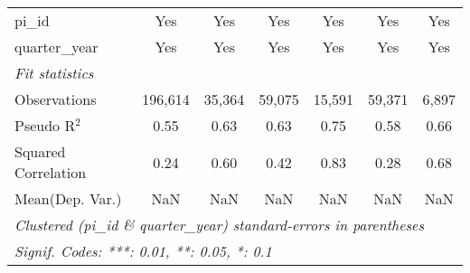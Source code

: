 \begin{tabular}{lcccccc}
   pi\_id                                                     & Yes           & Yes           & Yes           & Yes           & Yes           & Yes\\  
   quarter\_year                                              & Yes           & Yes           & Yes           & Yes           & Yes           & Yes\\  
   \midrule
   \emph{Fit statistics}\\
   Observations                                               & 196,614       & 35,364        & 59,075        & 15,591        & 59,371        & 6,897\\  
   Pseudo R$^2$                                               & 0.55          & 0.63          & 0.63          & 0.75          & 0.58          & 0.66\\  
   Squared Correlation                                        & 0.24          & 0.60          & 0.42          & 0.83          & 0.28          & 0.68\\  
Mean(Dep. Var.) & NaN & NaN & NaN & NaN & NaN & NaN \\
   \midrule \midrule
   \multicolumn{7}{l}{\emph{Clustered (pi\_id \& quarter\_year) standard-errors in parentheses}}\\
   \multicolumn{7}{l}{\emph{Signif. Codes: ***: 0.01, **: 0.05, *: 0.1}}\\
\end{tabular}
\par\endgroup

